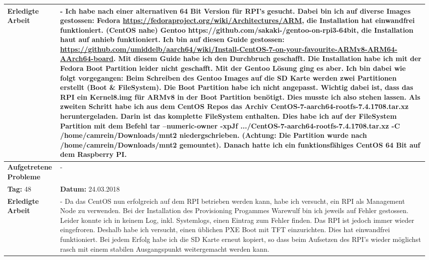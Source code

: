 \begin{longtable}{|p{5cm}|p{5cm}p{6cm}|}
\textbf{Erledigte Arbeit} & \multicolumn{2}{p{11cm}|}{- Ich habe nach einer alternativen 64 Bit Version für RPI's gesucht. Dabei bin ich auf diverse Images gestossen: \newline Fedora \url{https://fedoraproject.org/wiki/Architectures/ARM}, die Installation hat einwandfrei funktioniert. (CentOS nahe) \newline Gentoo https://github.com/sakaki-/gentoo-on-rpi3-64bit, die Installation haut auf anhieb funktioniert. Ich bin auf diesen Guide gestossen: \url{https://github.com/umiddelb/aarch64/wiki/Install-CentOS-7-on-your-favourite-ARMv8-ARM64-AArch64-board}. Mit diesem Guide habe ich den Durchbruch geschafft. Die Installation habe ich mit der Fedora Boot Partition leider nicht geschafft. Mit der Gentoo Lösung ging es aber. Ich bin dabei wie folgt vorgegangen: Beim Schreiben des Gentoo Images auf die SD Karte werden zwei Partitionen erstellt (Boot \& FileSystem). Die Boot Partition habe ich nicht angepasst. Wichtig dabei ist, dass das RPI ein Kernel8.img für ARMv8 in der Boot Partition benötigt. Dies musste ich also stehen lassen. Als zweiten Schritt habe ich aus dem CentOS Repos das Archiv CentOS-7-aarch64-rootfs-7.4.1708.tar.xz heruntergeladen. Darin ist das komplette FileSystem enthalten. Dies habe ich auf der FileSystem Partition mit dem Befehl tar --numeric-owner -xpJf .../CentOS-7-aarch64-rootfs-7.4.1708.tar.xz -C /home/camrein/Downloads/mnt2 niedergschrieben. (Achtung: Die Partition wurde nach /home/camrein/Downloads/mnt2 gemountet). Danach hatte ich ein funktionsfähiges CentOS 64 Bit auf dem Raspberry PI.} \\ \hline
\textbf{Aufgetretene Probleme} & \multicolumn{2}{p{11cm}|}{-} \\ \hline
\rowcolor{heading}\textbf{Tag:} 48 & \textbf{Datum:} 24.03.2018 & \\ \hline
\textbf{Erledigte Arbeit} & \multicolumn{2}{p{11cm}|}{- 	
Da das CentOS nun erfolgreich auf dem RPI betrieben werden kann, habe ich versucht, ein RPI als Management Node zu verwenden. Bei der Installation des Provisioning Progammes Warewulf bin ich jeweils auf Fehler gestossen. Leider konnte ich in keinem Log, inkl. Systemlogs, einen Eintrag zum Fehler finden. Das RPI ist jedoch immer wieder eingefroren. Deshalb habe ich versucht, einen üblichen PXE Boot mit TFT einzurichten. Dies hat einwandfrei funktioniert. Bei jedem Erfolg habe ich die SD Karte erneut kopiert, so dass beim Aufsetzen des RPI's wieder möglichst rasch mit einem stabilen Ausgangspunkt weitergemacht werden kann.} \\ \hline

\end{longtable}
